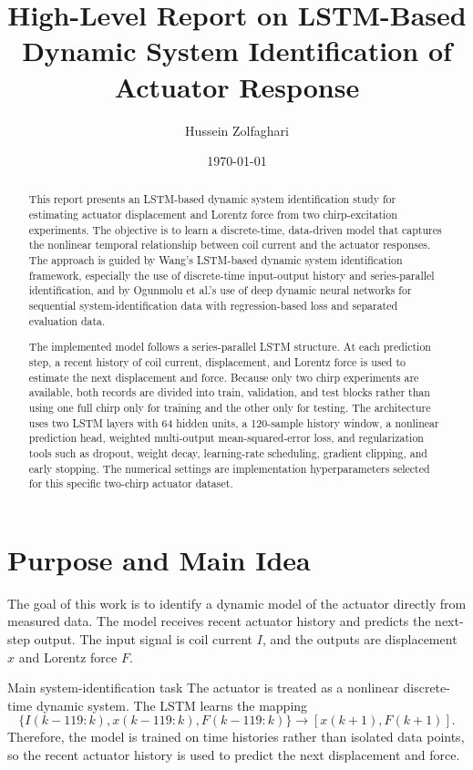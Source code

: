 \documentclass[11pt]{article}
\title{High-Level Report on LSTM-Based Dynamic System Identification of Actuator Response}
\author{Hussein Zolfaghari}
\date{\today}
\begin{document}
\maketitle

\begin{abstract}
This report presents an LSTM-based dynamic system identification study for estimating actuator displacement and Lorentz force from two chirp-excitation experiments. The objective is to learn a discrete-time, data-driven model that captures the nonlinear temporal relationship between coil current and the actuator responses. The approach is guided by Wang's LSTM-based dynamic system identification framework, especially the use of discrete-time input-output history and series-parallel identification, and by Ogunmolu et al.'s use of deep dynamic neural networks for sequential system-identification data with regression-based loss and separated evaluation data.

The implemented model follows a series-parallel LSTM structure. At each prediction step, a recent history of coil current, displacement, and Lorentz force is used to estimate the next displacement and force. Because only two chirp experiments are available, both records are divided into train, validation, and test blocks rather than using one full chirp only for training and the other only for testing. The architecture uses two LSTM layers with 64 hidden units, a 120-sample history window, a nonlinear prediction head, weighted multi-output mean-squared-error loss, and regularization tools such as dropout, weight decay, learning-rate scheduling, gradient clipping, and early stopping. The numerical settings are implementation hyperparameters selected for this specific two-chirp actuator dataset.
\end{abstract}

\section{Purpose and Main Idea}
The goal of this work is to identify a dynamic model of the actuator directly from measured data. The model receives recent actuator history and predicts the next-step output. The input signal is coil current $I$, and the outputs are displacement $x$ and Lorentz force $F$.

\begin{summarybox}{Main system-identification task}
The actuator is treated as a nonlinear discrete-time dynamic system. The LSTM learns the mapping
\begin{equation}
\{I(k-119:k),x(k-119:k),F(k-119:k)\}\rightarrow [x(k+1),F(k+1)].
\end{equation}
Therefore, the model is trained on time histories rather than isolated data points, so the recent actuator history is used to predict the next displacement and force.
\end{summarybox}
\end{document}
